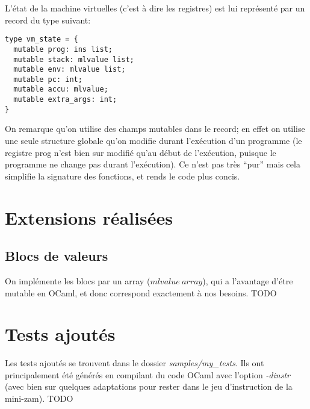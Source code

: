 \documentclass{article}
\begin{document}
L'état de la machine virtuelles (c'est à dire les registres) est lui représenté par un record du type suivant:
\begin{lstlisting}
type vm_state = {
  mutable prog: ins list;
  mutable stack: mlvalue list;
  mutable env: mlvalue list;
  mutable pc: int;
  mutable accu: mlvalue;
  mutable extra_args: int;
}
\end{lstlisting}
On remarque qu'on utilise des champs mutables dans le record; en effet on utilise une seule structure globale qu'on modifie durant l'exécution d'un programme (le registre prog n'est bien sur modifié qu'au début de l'exécution, puisque le programme ne change pas durant l'exécution). Ce n'est pas très ``pur'' mais cela simplifie la signature des fonctions, et rends le code plus concis.

\section{Extensions réalisées}

\subsection{Blocs de valeurs}
On implémente les blocs par un array ($mlvalue\:array$), qui a l'avantage d'étre mutable en OCaml, et donc correspond exactement à nos besoins.
TODO

\section{Tests ajoutés}
Les tests ajoutés se trouvent dans le dossier \textit{samples/my\_tests}. Ils ont principalement été générés en compilant du code OCaml avec l'option \textit{-dinstr} (avec bien sur quelques adaptations pour rester dans le jeu d'instruction de la mini-zam).
TODO
\end{document}
